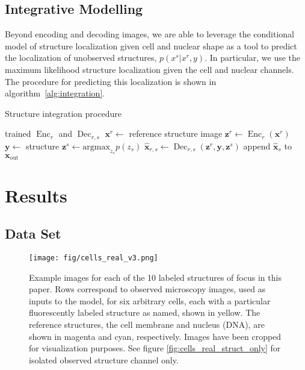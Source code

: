 \documentclass[accepted]{article}
\DeclareMathOperator{\Enc}{Enc}
\DeclareMathOperator{\Dec}{Dec}
\begin{document}
\subsection{Integrative Modelling}
Beyond encoding and decoding images, we are able to leverage the conditional model of structure localization given cell and nuclear shape as a tool to predict the localization of unobserved structures, $p(x^s|x^r, y)$.
In particular, we use the maximum likelihood  structure localization given the cell and nuclear channels.
The procedure for predicting this localization is shown in algorithm~\ref{alg:integration}.

\begin{algorithm}[htbp]
   \caption{Structure integration procedure}
   \label{alg:integration}
\begin{algorithmic}
   \STATE trained $\Enc_{r}$ and $\Dec_{r,s}$
   \STATE $\bm{x}^r \gets$ reference structure image
   \STATE $\bm{z}^r \gets \Enc_{r}(\bm{x}^{r})$
   \STATE $\bm{y} \gets$ structure
   \STATE $\bm{z}^s \gets \text{argmax}_{z_{s}} p(z_{s})$ %
   \STATE $\bm{\hat{x}}_{r,s} \gets \Dec_{r,s}(\bm{z}^r, \bm{y}, \bm{z}^s)$
   \STATE append $\hat{\bm{x}}_{s}$ to $\bm{x}_{\text{out}}$
   \ENDFOR
\end{algorithmic}
\end{algorithm}

\section{Results}
\label{results}

\subsection{Data Set}

\begin{figure}[htbp]
\centering
\texttt{[image: fig/cells\_real\_v3.png]}
\caption{Example images for each of the 10 labeled structures of focus in this paper.
Rows correspond to observed microscopy images, used as inputs to the model, for six arbitrary cells, each with a particular fluorescently labeled structure as named, shown in yellow.
The reference structures, the cell membrane and nucleus (DNA), are shown in magenta and cyan, respectively.
Images have been cropped for visualization purposes.
See figure \ref{fig:cells_real_struct_only} for isolated observed structure channel only.}
\label{fig:cells_real}
\end{figure}
\end{document}
